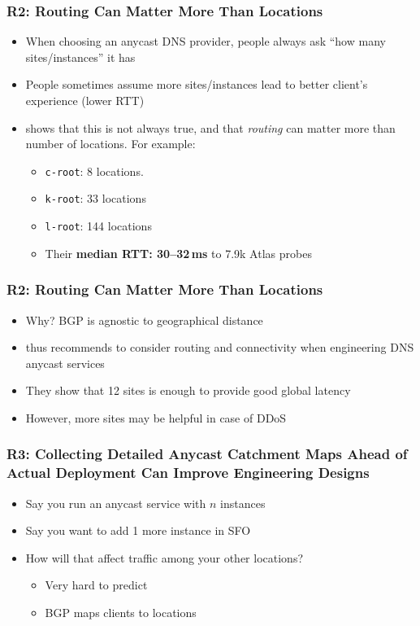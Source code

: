 \documentclass[11pt,show 
notes,notheorems,noamsthm,blank]{beamer} %
\begin{document}
\begin{frame}
 \frametitle{R2: Routing Can Matter More Than Locations}
 
 \begin{itemize}
  \item When choosing an anycast DNS provider, people always ask ``how many 
sites/instances'' it has
 \item People sometimes assume more sites/instances lead to better client's 
experience (lower RTT)
 \item \cite{Schmidt17a} shows that this is not always true, and that 
\textit{routing} can matter more than number of locations. For example:
\begin{itemize}
 \item \texttt{c-root}: 8 locations. 
 \item \texttt{k-root}: 33 locations
 \item \texttt{l-root}: 144 locations
 \item Their\textbf{ median RTT: 30--32\,ms }to 7.9k Atlas probes
\end{itemize}


 \end{itemize}

\end{frame}


\begin{frame}
 \frametitle{R2: Routing Can Matter More Than Locations}
 
\begin{itemize}
 \item Why? BGP is agnostic to geographical distance
 \item \cite{Schmidt17a} thus recommends to consider routing and connectivity 
when engineering DNS anycast services
\item They show that 12 sites is enough to provide good global latency 
\item However, more sites may be helpful in case of DDoS~\cite{Moura16b}
\end{itemize}


\end{frame}

\begin{frame}
 \frametitle{R3: Collecting Detailed Anycast Catchment Maps Ahead of Actual
    Deployment Can Improve Engineering Designs}
    
    \begin{itemize}
     \item Say you run an anycast service with $n$  instances
     \item  Say you want to add 1 more  instance in SFO
     \item How will that affect traffic among your other locations?
      \begin{itemize}
       \item Very hard to predict
       \item BGP maps clients to locations
      \end{itemize}

    \end{itemize}

    
\end{frame}
\end{document}
